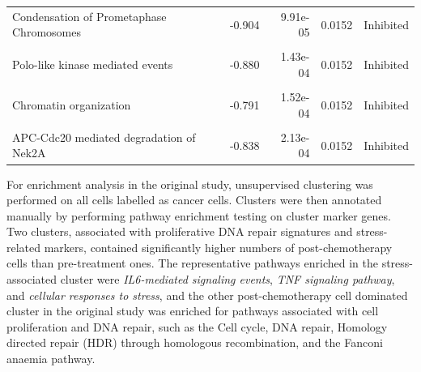 \documentclass[9pt,a4paper,]{extarticle}
\begin{document}
\begin{table}
{\begin{tabular}[t]{lrrrl}
Condensation of Prometaphase Chromosomes & -0.904 & 9.91e-05 & 0.0152 & Inhibited\\
\cellcolor{gray!10}{Epigenetic regulation of gene expression} & \cellcolor{gray!10}{-0.790} & \cellcolor{gray!10}{1.21e-04} & \cellcolor{gray!10}{0.0152} & \cellcolor{gray!10}{Inhibited}\\
\addlinespace
Polo-like kinase mediated events & -0.880 & 1.43e-04 & 0.0152 & Inhibited\\
\cellcolor{gray!10}{Chromatin modifying enzymes} & \cellcolor{gray!10}{-0.791} & \cellcolor{gray!10}{1.52e-04} & \cellcolor{gray!10}{0.0152} & \cellcolor{gray!10}{Inhibited}\\
Chromatin organization & -0.791 & 1.52e-04 & 0.0152 & Inhibited\\
\cellcolor{gray!10}{SUMO E3 ligases SUMOylate target proteins} & \cellcolor{gray!10}{-0.767} & \cellcolor{gray!10}{1.83e-04} & \cellcolor{gray!10}{0.0152} & \cellcolor{gray!10}{Inhibited}\\
APC-Cdc20 mediated degradation of Nek2A & -0.838 & 2.13e-04 & 0.0152 & Inhibited\\
\bottomrule
\end{tabular}}
\end{table}

For enrichment analysis in the original study\citep{Zhang2022}, unsupervised clustering was performed on all cells labelled as cancer cells.
Clusters were then annotated manually by performing pathway enrichment testing on cluster marker genes.
Two clusters, associated with proliferative DNA repair signatures and stress-related markers, contained significantly higher numbers of post-chemotherapy cells than pre-treatment ones\citep{Zhang2022}.
The representative pathways enriched in the stress-associated cluster were \emph{IL6-mediated signaling events}, \emph{TNF signaling pathway}, and \emph{cellular responses to stress}, and the other post-chemotherapy cell dominated cluster in the original study was enriched for pathways associated with cell proliferation and DNA repair, such as the Cell cycle, DNA repair, Homology directed repair (HDR) through homologous recombination, and the Fanconi anaemia pathway.
\end{document}
